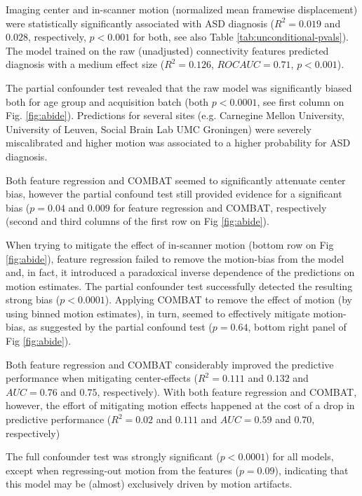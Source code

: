 \documentclass{article}
\begin{document}
Imaging center and in-scanner motion (normalized mean framewise displacement) were statistically significantly associated with ASD diagnosis ($R^2=0.019$ and $0.028$, respectively, $p<0.001$ for both, see also Table \ref{tab:unconditional-pvals}). The model trained on the raw (unadjusted) connectivity features predicted diagnosis with a medium effect size ($R^2=0.126$, $ROC AUC = 0.71$, $p<0.001$).

The partial confounder test revealed that the raw model was significantly biased both for age group and acquisition batch (both $p<0.0001$, see first column on Fig. \ref{fig:abide}). Predictions for several sites (e.g. Carnegine Mellon University, University of Leuven, Social Brain Lab UMC Groningen) were severely miscalibrated and higher motion was associated to a higher probability for ASD diagnosis.

Both feature regression and COMBAT seemed to significantly attenuate center bias, however the partial confound test still provided evidence for a significant bias ($p=0.04$ and $0.009$ for feature regression and COMBAT, respectively (second and third columns of the first row on Fig \ref{fig:abide}). 

When trying to mitigate the effect of in-scanner motion (bottom row on Fig \ref{fig:abide}), feature regression failed to remove the motion-bias from the model and, in fact, it introduced a paradoxical inverse dependence of the predictions on motion estimates. The partial confounder test successfully detected the resulting strong bias ($p<0.0001$). Applying COMBAT to remove the effect of motion (by using binned motion estimates), in turn, seemed to effectively mitigate motion-bias, as suggested by the partial confound test ($p=0.64$, bottom right panel of Fig \ref{fig:abide}).

Both feature regression and COMBAT considerably improved the predictive performance when mitigating center-effects ($R^2=0.111$ and $0.132$ and $AUC=0.76$ and $0.75$, respectively). With both feature regression and COMBAT, however, the effort of mitigating motion effects happened at the cost of a drop in predictive performance ($R^2=0.02$ and $0.111$ and $AUC=0.59$ and $0.70$, respectively)

The full confounder test was strongly significant ($p<0.0001$) for all models, except when regressing-out motion from the features ($p=0.09$), indicating that this model may be (almost) exclusively driven by motion artifacts.
\end{document}
